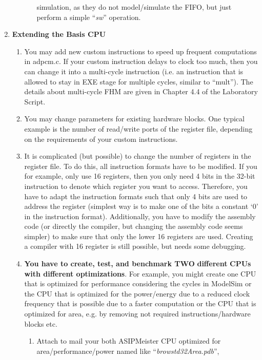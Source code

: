 \begin{enumerate}
\begin{enumerate}
\begin{enumerate}
			simulation, as they do not model/simulate the FIFO, but just
			perform a simple ``\emph{sw}'' operation.
		\end{enumerate}
	\end{enumerate}
\item \textbf{Extending the Basis CPU}
	\begin{enumerate}
		\item
		You may add new custom instructions to speed up frequent
		computations in adpcm.c. If your custom instruction delays to clock
		too much, then you can change it into a multi-cycle instruction
		(i.e. an instruction that is allowed to stay in EXE stage for
		multiple cycles, similar to ``mult''). The details about multi-cycle
		FHM are given in Chapter 4.4 of the Laboratory Script.
		\item
		You may change parameters for existing hardware blocks. One typical
		example is the number of read/write ports of the register file,
		depending on the requirements of your custom instructions.
		\item
		It is complicated (but possible) to change the number of registers
		in the register file. To do this, all instruction formats have to be
		modified. If you for example, only use 16 registers, then you only
		need 4 bits in the 32-bit instruction to denote which register you
		want to access. Therefore, you have to adapt the instruction formats
		such that only 4 bits are used to address the register (simplest way
		is to make one of the bits a constant `0' in the instruction
		format). Additionally, you have to modify the assembly code (or
		directly the compiler, but changing the assembly code seems simpler)
		to make sure that only the lower 16 registers are used. Creating a
		compiler with 16 register is still possible, but needs some
		debugging.
		\item
		{\textbf{You have to create, test, and benchmark TWO}
			\textbf{different} \textbf{CPUs with different optimizations}}. For
		example, you might create one CPU that is optimized for performance
		considering the cycles in ModelSim or the CPU that is optimized for
		the power/energy due to a reduced clock frequency that is possible
		due to a faster computation or the CPU that is optimized for area,
		e.g. by removing not required instructions/hardware blocks etc.
		\begin{enumerate}[label=(\alph*),start=1]
			\color{red}\item\normalcolor
			Attach to mail your both ASIPMeister CPU optimized for
			area/performance/power named like ``\emph{browstd32Area.pdb}'',

\end{enumerate}
\end{enumerate}
\end{enumerate}
